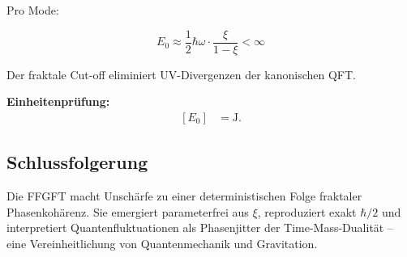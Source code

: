	Pro Mode:
	
	\begin{equation}
		E_0 \approx \frac{1}{2} \hbar \omega \cdot \frac{\xi}{1 - \xi} < \infty
	\end{equation}
	
	Der fraktale Cut-off eliminiert UV-Divergenzen der kanonischen QFT.
	
	\textbf{Einheitenprüfung:}
	\[
	\begin{aligned}
		[E_0] &= \si{\joule}.
	\end{aligned}
	\]
	
	\subsection*{Schlussfolgerung}
	
	Die FFGFT macht Unschärfe zu einer deterministischen Folge fraktaler Phasenkohärenz. Sie emergiert parameterfrei aus \(\xi\), reproduziert exakt \(\hbar/2\) und interpretiert Quantenfluktuationen als Phasenjitter der Time-Mass-Dualität – eine Vereinheitlichung von Quantenmechanik und Gravitation.




